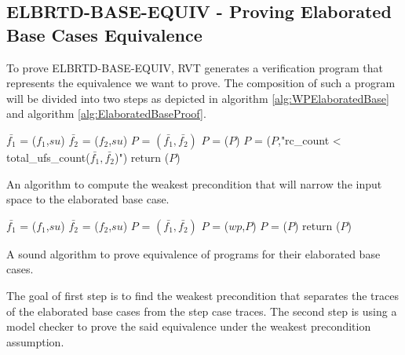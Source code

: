 \subsection{ELBRTD-BASE-EQUIV - Proving Elaborated Base Cases Equivalence}
\label{sec:ELBRTD-BASE-EQUIV}
To prove ELBRTD-BASE-EQUIV, RVT generates a verification program that represents the equivalence we want to prove. The composition of such a program will be divided into two steps as depicted in algorithm \ref{alg:WPElaboratedBase} and algorithm  \ref{alg:ElaboratedBaseProof}.
\noindent
\begin{algorithm}
\begin{minipage}{\linewidth}
\begin{algorithmic}[1]
	\State$\bar{f_1}$ = ($f_1$,$su$)
	\State$\bar{f_2}$ = ($f_2$,$su$)
	\State $P$ = $(\bar{f_1},\bar{f_2})$
	\State $P$ = ($P$)
    \State $P$ = ($P$,"rc\_count < total\_ufs\_count($\bar{f_1},\bar{f_2}$)")
    \State return ($P$)
	\EndFunction
\end{algorithmic}
\end{minipage}
\caption{An algorithm to compute the weakest precondition that will narrow the input space to the elaborated base case.}
\label{alg:WPElaboratedBase}
\end{algorithm}
\noindent
\begin{algorithm}
\begin{minipage}{\linewidth}
\begin{algorithmic}[1]
	\State$\bar{f_1}$ = ($f_1$,$su$)
	\State$\bar{f_2}$ = ($f_2$,$su$)
	\State $P$ = $(\bar{f_1},\bar{f_2})$
    \State $P$ = ($wp$,$P$)
    \State $P$ = ($P$)
    \State return ($P$)
	\EndFunction
\end{algorithmic}
\end{minipage}
\caption{A sound algorithm to prove equivalence of programs for their elaborated base cases.}
\label{alg:ElaboratedBaseProof}
\end{algorithm}
The goal of first step is to find the weakest precondition that separates the traces of the elaborated base cases from the step case traces. The second step is using a model checker to prove the said equivalence under the weakest precondition assumption.
